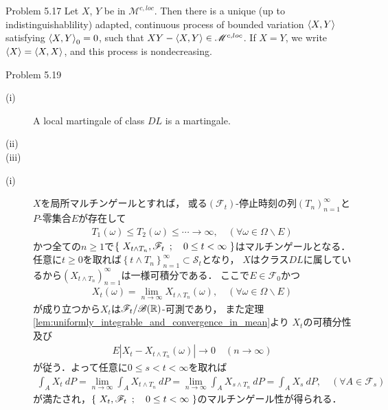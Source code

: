 	\begin{itembox}[l]{Problem 5.17}
		Let $X$, $Y$ be in $\mathscr{M}^{c,loc}$. Then there is a unique (up to indistinguishablility) adapted,
		continuous process of bounded variation $\inprod<X,Y>$ satisfying $\inprod<X,Y>_0 = 0$,
		such that $XY - \inprod<X,Y> \in \mathscr{M}^{c,loc}$. If $X = Y$, we write $\inprod<X> = \inprod<X,X>$,
		and this process is nondecreasing.
	\end{itembox}
	
	\begin{prf}
		
	\end{prf}
	
	\begin{itembox}[l]{Problem 5.19}
		\begin{description}
			\item[(i)] A local martingale of class $DL$ is a martingale.
			\item[(ii)]
			\item[(iii)]
		\end{description}
	\end{itembox}
	
	\begin{prf}\mbox{}
		\begin{description}
			\item[(i)] $X$を局所マルチンゲールとすれば，
				或る$(\mathscr{F}_t)$-停止時刻の列$(T_n)_{n=1}^\infty$と$P$-零集合$E$が存在して
				\begin{align}
					T_1(\omega) \leq T_2(\omega) \leq \cdots \longrightarrow \infty,
					\quad (\forall \omega \in \Omega \backslash E)
				\end{align}
				かつ全ての$n \geq 1$で$\left\{\ X_{t \wedge T_n},\mathscr{F}_t\ \, ; \quad 0 \leq t < \infty\ \right\}$はマルチンゲールとなる．
				任意に$t \geq 0$を取れば$\left\{t \wedge T_n\right\}_{n=1}^\infty \subset \mathscr{S}_t$となり，
				$X$はクラス$DL$に属しているから$\left(X_{t \wedge T_n}\right)_{n=1}^\infty$は一様可積分である．
				ここで$E \in \mathscr{F}_0$かつ
				\begin{align}
					X_t(\omega) = \lim_{n \to \infty} X_{t \wedge T_n}(\omega),
					\quad (\forall \omega \in \Omega \backslash E)
				\end{align}
				が成り立つから$X_t$は$\mathscr{F}_t/\mathscr{B}(\mathbb{R})$-可測であり，
				また定理\ref{lem:uniformly_integrable_and_convergence_in_mean}より
				$X_t$の可積分性及び
				\begin{align}
					E\left| X_t - X_{t \wedge T_n}(\omega) \right| \longrightarrow 0
					\quad (n \longrightarrow \infty)
				\end{align}
				が従う．よって任意に$0 \leq s < t < \infty$を取れば
				\begin{align}
					\int_A X_t\ dP = \lim_{n \to \infty} \int_A X_{t \wedge T_n}\ dP
					= \lim_{n \to \infty} \int_A X_{s \wedge T_n}\ dP
					= \int_A X_s\ dP,
					\quad (\forall A \in \mathscr{F}_s)
				\end{align}
				が満たされ，$\left\{\ X_t,\mathscr{F}_t\ \, ; \quad 0 \leq t < \infty\ \right\}$のマルチンゲール性が得られる．
		\end{description}
	\end{prf}
	
